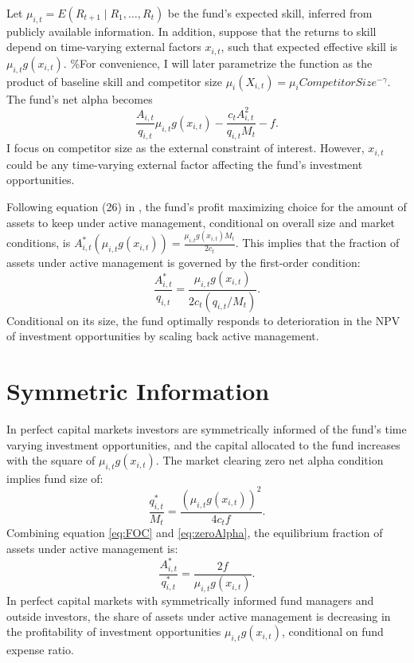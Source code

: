 \documentclass[openany]{book}
\theoremstyle{definition}
\theoremstyle{definition}
\theoremstyle{definition}
\theoremstyle{remark}
\begin{document}
Let \(\mu_{i,t}=E(R_{t+1}\mid R_1,\ldots,R_t)\) be the fund's expected
skill, inferred from publicly available information. In addition,
suppose that the returns to skill depend on time-varying external
factors \(x_{i,t}\), such that expected effective skill is
\(\mu_{i,t}g(x_{i,t})\). \%For convenience, I will later parametrize the
function as the product of baseline skill and competitor size
\(\mu_i(X_{i,t})=\mu_i CompetitorSize^{-\gamma}\). The fund's net alpha
becomes \begin{equation}
\frac{A_{i,t}}{q_{i,t}}\mu_{i,t}g(x_{i,t})-\frac{c_t A_{i,t}^2}{q_{i,t}M_t}-f. 
\end{equation} I focus on competitor size as the external constraint of
interest. However, \(x_{i,t}\) could be any time-varying external factor
affecting the fund's investment opportunities.

Following equation (26) in \citet{bg04}, the fund's profit maximizing
choice for the amount of assets to keep under active management,
conditional on overall size and market conditions, is
\(A_{i,t}^\ast(\mu_{i,t}g(x_{i,t}))=\frac{\mu_{i,t}g(x_{i,t}) M_t}{2c_t}\).
This implies that the fraction of assets under active management is
governed by the first-order condition: \begin{equation}
\frac{A_{i,t}^\ast}{q_{i,t}}=\frac{\mu_{i,t}g(x_{i,t})}{2c_t(q_{i,t}/M_t)}.
\label{eq:FOC}
\end{equation} Conditional on its size, the fund optimally responds to
deterioration in the NPV of investment opportunities by scaling back
active management.

\hypertarget{symmetric-information}{%
\section{Symmetric Information}\label{symmetric-information}}

In perfect capital markets investors are symmetrically informed of the
fund's time varying investment opportunities, and the capital allocated
to the fund increases with the square of \(\mu_{i,t}g(x_{i,t})\). The
market clearing zero net alpha condition implies fund size of:
\begin{equation}
\frac{q_{i,t}^\ast}{M_t}=\frac{(\mu_{i,t}g(x_{i,t}))^2}{4c_t f}.
\label{eq:zeroAlpha}
\end{equation} Combining equation \eqref{eq:FOC} and \eqref{eq:zeroAlpha},
the equilibrium fraction of assets under active management is:
\begin{equation}
\frac{A_{i,t}^\ast}{q_{i,t}^\ast}=\frac{2f}{\mu_{i,t}g(x_{i,t})}.
\label{eq:capMkt}
\end{equation} In perfect capital markets with symmetrically informed
fund managers and outside investors, the share of assets under active
management is decreasing in the profitability of investment
opportunities \(\mu_{i,t}g(x_{i,t})\), conditional on fund expense
ratio.
\end{document}
